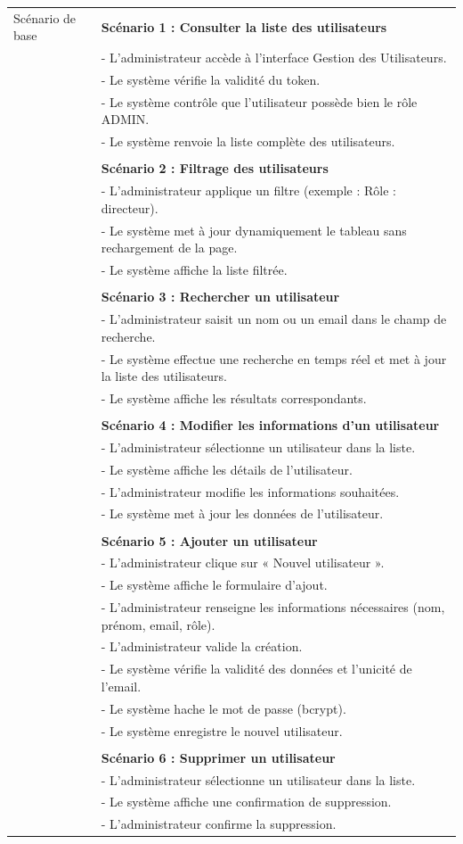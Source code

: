 {\begin{longtable}{|l|p{12cm}|}
Scénario de base &
\textbf{Scénario 1 : Consulter la liste des utilisateurs} \\
&- L'administrateur accède à l'interface Gestion des Utilisateurs. \\
&- Le système vérifie la validité du token. \\
&- Le système contrôle que l'utilisateur possède bien le rôle ADMIN. \\
&- Le système renvoie la liste complète des utilisateurs. \\
\\
& \textbf{Scénario 2 : Filtrage des utilisateurs} \\
&- L'administrateur applique un filtre (exemple : Rôle : directeur). \\
&- Le système met à jour dynamiquement le tableau sans rechargement de la page. \\
&- Le système affiche la liste filtrée. \\
\\
& \textbf{Scénario 3 : Rechercher un utilisateur} \\
&- L'administrateur saisit un nom ou un email dans le champ de recherche. \\
&- Le système effectue une recherche en temps réel et met à jour la liste des utilisateurs. \\
&- Le système affiche les résultats correspondants. \\
\\
& \textbf{Scénario 4 : Modifier les informations d'un utilisateur} \\
&- L'administrateur sélectionne un utilisateur dans la liste. \\
&- Le système affiche les détails de l'utilisateur. \\
&- L'administrateur modifie les informations souhaitées. \\
&- Le système met à jour les données de l'utilisateur. \\
\\
& \textbf{Scénario 5 : Ajouter un utilisateur} \\
&- L'administrateur clique sur « Nouvel utilisateur ». \\
&- Le système affiche le formulaire d'ajout. \\
&- L'administrateur renseigne les informations nécessaires (nom, prénom, email, rôle). \\
&- L'administrateur valide la création. \\
&- Le système vérifie la validité des données et l'unicité de l'email. \\
&- Le système hache le mot de passe (bcrypt). \\
&- Le système enregistre le nouvel utilisateur. \\
\\
& \textbf{Scénario 6 : Supprimer un utilisateur} \\
&- L'administrateur sélectionne un utilisateur dans la liste. \\
&- Le système affiche une confirmation de suppression. \\
&- L'administrateur confirme la suppression. \\


\end{longtable}}
